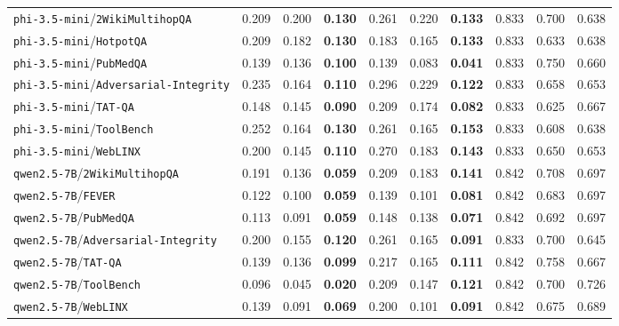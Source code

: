 \begin{longtable}{l|ccc|ccc|ccc}
\texttt{phi-3.5-mini}/\texttt{2WikiMultihopQA} & 0.209 & 0.200 & \textbf{0.130} & 0.261 & 0.220 & \textbf{0.133} & 0.833 & 0.700 & 0.638 \\
\texttt{phi-3.5-mini}/\texttt{HotpotQA} & 0.209 & 0.182 & \textbf{0.130} & 0.183 & 0.165 & \textbf{0.133} & 0.833 & 0.633 & 0.638 \\
\texttt{phi-3.5-mini}/\texttt{PubMedQA} & 0.139 & 0.136 & \textbf{0.100} & 0.139 & 0.083 & \textbf{0.041} & 0.833 & 0.750 & 0.660 \\
\texttt{phi-3.5-mini}/\texttt{Adversarial-Integrity} & 0.235 & 0.164 & \textbf{0.110} & 0.296 & 0.229 & \textbf{0.122} & 0.833 & 0.658 & 0.653 \\
\texttt{phi-3.5-mini}/\texttt{TAT-QA} & 0.148 & 0.145 & \textbf{0.090} & 0.209 & 0.174 & \textbf{0.082} & 0.833 & 0.625 & 0.667 \\
\texttt{phi-3.5-mini}/\texttt{ToolBench} & 0.252 & 0.164 & \textbf{0.130} & 0.261 & 0.165 & \textbf{0.153} & 0.833 & 0.608 & 0.638 \\
\texttt{phi-3.5-mini}/\texttt{WebLINX} & 0.200 & 0.145 & \textbf{0.110} & 0.270 & 0.183 & \textbf{0.143} & 0.833 & 0.650 & 0.653 \\
\texttt{qwen2.5-7B}/\texttt{2WikiMultihopQA} & 0.191 & 0.136 & \textbf{0.059} & 0.209 & 0.183 & \textbf{0.141} & 0.842 & 0.708 & 0.697 \\
\texttt{qwen2.5-7B}/\texttt{FEVER} & 0.122 & 0.100 & \textbf{0.059} & 0.139 & 0.101 & \textbf{0.081} & 0.842 & 0.683 & 0.697 \\
\texttt{qwen2.5-7B}/\texttt{PubMedQA} & 0.113 & 0.091 & \textbf{0.059} & 0.148 & 0.138 & \textbf{0.071} & 0.842 & 0.692 & 0.697 \\
\texttt{qwen2.5-7B}/\texttt{Adversarial-Integrity} & 0.200 & 0.155 & \textbf{0.120} & 0.261 & 0.165 & \textbf{0.091} & 0.833 & 0.700 & 0.645 \\
\texttt{qwen2.5-7B}/\texttt{TAT-QA} & 0.139 & 0.136 & \textbf{0.099} & 0.217 & 0.165 & \textbf{0.111} & 0.842 & 0.758 & 0.667 \\
\texttt{qwen2.5-7B}/\texttt{ToolBench} & 0.096 & 0.045 & \textbf{0.020} & 0.209 & 0.147 & \textbf{0.121} & 0.842 & 0.700 & 0.726 \\
\texttt{qwen2.5-7B}/\texttt{WebLINX} & 0.139 & 0.091 & \textbf{0.069} & 0.200 & 0.101 & \textbf{0.091} & 0.842 & 0.675 & 0.689 \\
\bottomrule
\end{longtable}
